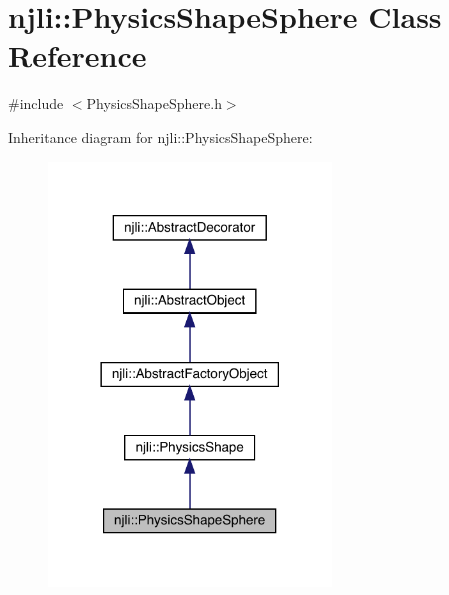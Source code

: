 \hypertarget{classnjli_1_1_physics_shape_sphere}{}\section{njli\+:\+:Physics\+Shape\+Sphere Class Reference}
\label{classnjli_1_1_physics_shape_sphere}


{\ttfamily \#include $<$Physics\+Shape\+Sphere.\+h$>$}



Inheritance diagram for njli\+:\+:Physics\+Shape\+Sphere\+:\nopagebreak
\begin{figure}[H]
\begin{center}
\leavevmode
\includegraphics[width=213pt]{classnjli_1_1_physics_shape_sphere__inherit__graph}
\end{center}
\end{figure}


